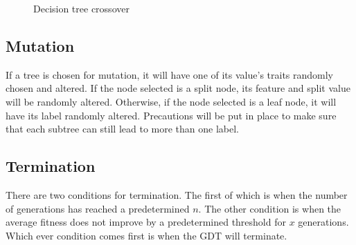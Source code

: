 \documentclass[12pt]{article}
\begin{document}
\begin{figure}[H]
    \centering
    \caption{Decision tree crossover}
    \label{fig:treecrossover}
\end{figure}

\subsection{Mutation}

If a tree is chosen for mutation, it will have one of its value's traits randomly chosen and altered. If the node selected is a split node, its feature and split value will be randomly altered. Otherwise, if the node selected is a leaf node, it will have its label randomly altered. Precautions will be put in place to make sure that each subtree can still lead to more than one label.

\subsection{Termination}

There are two conditions for termination. The first of which is when the number of generations has reached a predetermined $n$. The other condition is when the average fitness does not improve by a predetermined threshold for $x$ generations. Which ever condition comes first is when the GDT will terminate.
\end{document}
